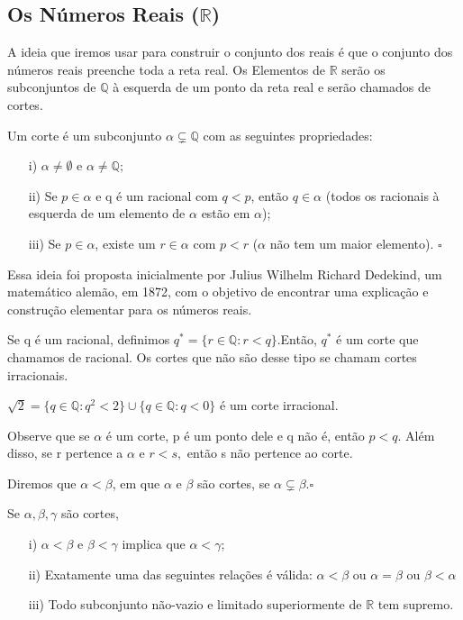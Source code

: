 \documentclass[analysis_notes.tex]{subfiles}
\begin{document}
\subsection{Os N\'umeros Reais ($\mathbb{R}$)}
A ideia que iremos usar para construir o conjunto dos reais \'e que o conjunto dos n\'umeros reais preenche toda a reta real. Os Elementos
de $\mathbb{R}$ ser\~ao os subconjuntos de $\mathbb{Q}$ \`a esquerda de um ponto da reta real e ser\~ao chamados de cortes.
\begin{def*}
	Um corte \'e um subconjunto $\alpha\subsetneq \mathbb{Q}$ com as seguintes propriedades:
	\begin{itemize}
		\item[i)] $\alpha\neq \emptyset$ e $\alpha \neq \mathbb{Q};$
		\item[ii)] Se $p\in \alpha$ e q \'e um racional com $q < p$, ent\~ao $q\in \alpha$ (todos os racionais \`a esquerda de um elemento
		      de $\alpha$ est\~ao em $\alpha$);
		\item[iii)] Se $p\in \alpha$, existe um $r\in \alpha$ com $p < r$ ($\alpha$ n\~ao tem um maior elemento). $\square$
	\end{itemize}
\end{def*}
Essa ideia foi proposta inicialmente por Julius Wilhelm Richard Dedekind, um matem\'atico alem\~ao, em 1872, com o objetivo de encontrar uma explica\c c\~ao
e constru\c c\~ao elementar para os n\'umeros reais.
\begin{example}
	Se q \'e um racional, definimos $q^{*} = \{r\in \mathbb{Q}: r < q\}$.Ent\~ao, $q^{*}$ \'e um corte que chamamos de racional. Os
	cortes que n\~ao s\~ao desse tipo se chamam cortes irracionais.
\end{example}
\begin{example}
	$\sqrt{2} = \{q\in \mathbb{Q}: q^{2} < 2\}\cup \{q\in \mathbb{Q}: q < 0\}$ \'e um corte irracional.
\end{example}
Observe que se $\alpha$ \'e um corte, p \'e um ponto dele e q n\~ao \'e, ent\~ao $p < q$. Al\'em disso, se r pertence a $\alpha$
e $r < s,$ ent\~ao s n\~ao pertence ao corte.
\begin{def*}
	Diremos que $\alpha < \beta$, em que $\alpha$ e $\beta$ s\~ao cortes, se $\alpha\subsetneq \beta.\square$
\end{def*}
\begin{prop*}
	Se $\alpha, \beta, \gamma$ s\~ao cortes,
	\begin{itemize}
		\item[i)] $\alpha < \beta$ e $\beta < \gamma$ implica que $\alpha < \gamma$;
		\item[ii)] Exatamente uma das seguintes rela\c c\~oes \'e v\'alida: $\alpha < \beta$ ou $\alpha = \beta$ ou $\beta < \alpha$
		\item[iii)] Todo subconjunto n\~ao-vazio e limitado superiormente de $\mathbb{R}$ tem supremo.
	\end{itemize}
\end{prop*}
\end{document}
